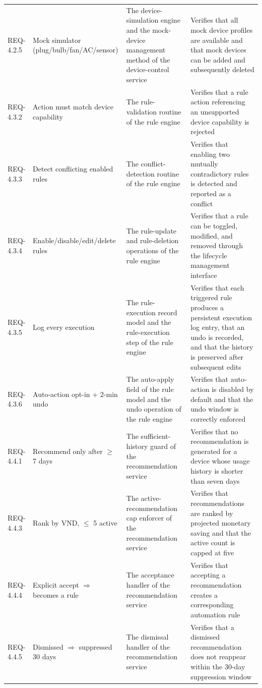 \begin{longtable}{@{}L{1.7cm} L{4.3cm} L{4.4cm} L{3.4cm}@{}}
REQ-4.2.5 & Mock simulator (plug/bulb/fan/AC/sensor) & The device-simulation engine and the mock-device management method of the device-control service & Verifies that all mock device profiles are available and that mock devices can be added and subsequently deleted \\
REQ-4.3.2 & Action must match device capability & The rule-validation routine of the rule engine & Verifies that a rule action referencing an unsupported device capability is rejected \\
REQ-4.3.3 & Detect conflicting enabled rules & The conflict-detection routine of the rule engine & Verifies that enabling two mutually contradictory rules is detected and reported as a conflict \\
REQ-4.3.4 & Enable/disable/edit/delete rules & The rule-update and rule-deletion operations of the rule engine & Verifies that a rule can be toggled, modified, and removed through the lifecycle management interface \\
REQ-4.3.5 & Log every execution & The rule-execution record model and the rule-execution step of the rule engine & Verifies that each triggered rule produces a persistent execution log entry, that an undo is recorded, and that the history is preserved after subsequent edits \\
REQ-4.3.6 & Auto-action opt-in + 2-min undo & The auto-apply field of the rule model and the undo operation of the rule engine & Verifies that auto-action is disabled by default and that the undo window is correctly enforced \\
REQ-4.4.1 & Recommend only after $\ge$ 7 days & The sufficient-history guard of the recommendation service & Verifies that no recommendation is generated for a device whose usage history is shorter than seven days \\
REQ-4.4.3 & Rank by VND, $\le$ 5 active & The active-recommendation cap enforcer of the recommendation service & Verifies that recommendations are ranked by projected monetary saving and that the active count is capped at five \\
REQ-4.4.4 & Explicit accept $\Rightarrow$ becomes a rule & The acceptance handler of the recommendation service & Verifies that accepting a recommendation creates a corresponding automation rule \\
REQ-4.4.5 & Dismissed $\Rightarrow$ suppressed 30 days & The dismissal handler of the recommendation service & Verifies that a dismissed recommendation does not reappear within the 30-day suppression window \\

\end{longtable}
